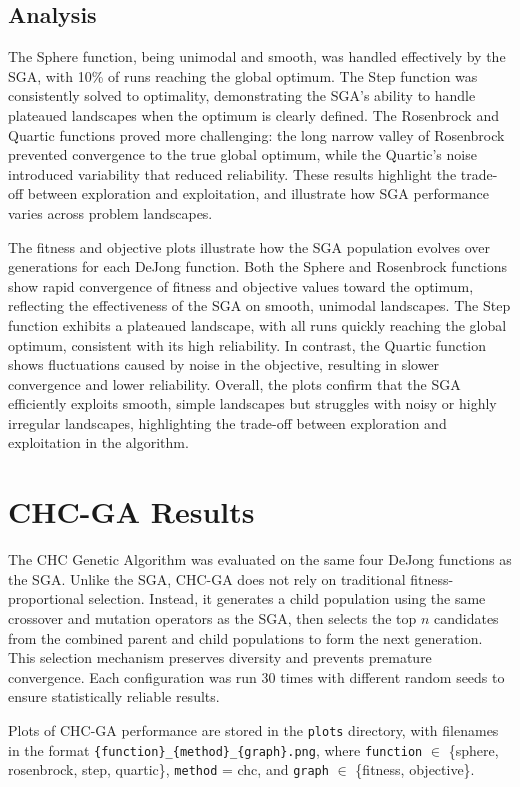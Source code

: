 \documentclass[11pt]{article}
\begin{document}
\subsection{Analysis}
The Sphere function, being unimodal and smooth, was handled effectively by the SGA, with 10\% of runs reaching the global optimum. The Step function was consistently solved to optimality, demonstrating the SGA’s ability to handle plateaued landscapes when the optimum is clearly defined. The Rosenbrock and Quartic functions proved more challenging: the long narrow valley of Rosenbrock prevented convergence to the true global optimum, while the Quartic’s noise introduced variability that reduced reliability. These results highlight the trade-off between exploration and exploitation, and illustrate how SGA performance varies across problem landscapes.

The fitness and objective plots illustrate how the SGA population evolves over generations for each DeJong function. Both the Sphere and Rosenbrock functions show rapid convergence of fitness and objective values toward the optimum, reflecting the effectiveness of the SGA on smooth, unimodal landscapes. The Step function exhibits a plateaued landscape, with all runs quickly reaching the global optimum, consistent with its high reliability. In contrast, the Quartic function shows fluctuations caused by noise in the objective, resulting in slower convergence and lower reliability. Overall, the plots confirm that the SGA efficiently exploits smooth, simple landscapes but struggles with noisy or highly irregular landscapes, highlighting the trade-off between exploration and exploitation in the algorithm.

\section{CHC-GA Results}
\label{section-chc-results}
The CHC Genetic Algorithm was evaluated on the same four DeJong functions as the SGA. Unlike the SGA, CHC-GA does not rely on traditional fitness-proportional selection. Instead, it generates a child population using the same crossover and mutation operators as the SGA, then selects the top $n$ candidates from the combined parent and child populations to form the next generation. This selection mechanism preserves diversity and prevents premature convergence. Each configuration was run 30 times with different random seeds to ensure statistically reliable results.  

Plots of CHC-GA performance are stored in the \texttt{plots} directory, with filenames in the format \texttt{\{function\}\_\{method\}\_\{graph\}.png}, where \texttt{function} $\in$ \{sphere, rosenbrock, step, quartic\}, \texttt{method} = chc, and \texttt{graph} $\in$ \{fitness, objective\}.
\end{document}
